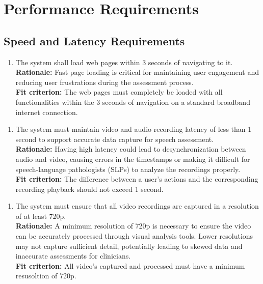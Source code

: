 \documentclass[12pt]{article}
\begin{document}
\section{Performance Requirements}
\subsection{Speed and Latency Requirements}
\begin{enumerate}[{PR-SL}1. ]
  \item The system shall load web pages within 3 seconds of navigating to it.\\
  \textbf{Rationale: }Fast page loading is critical for maintaining user engagement and reducing user frustrations during the assessment process.\\
  \textbf{Fit criterion: }The web pages must completely be loaded with all functionalities within the 3 seconds of navigation on a standard broadband internet connection.  
\end{enumerate}
\begin{enumerate}[{PR-SL}2. ]
  \item The system must maintain video and audio recording latency of less than 1 second to support accurate data capture for speech assessment.\\
  \textbf{Rationale: }Having high latency could lead to desynchronization between audio and video, causing errors in the timestamps or making it difficult for speech-language pathologists (SLPs) to analyze the recordings properly.\\
  \textbf{Fit criterion: }The difference between a user's actions and the corresponding recording playback should not exceed 1 second.  
\end{enumerate}
\begin{enumerate}[{PR-SL}3. ]
  \item The system must ensure that all video recordings are captured in a resolution of at least 720p.\\
  \textbf{Rationale: }A minimum resolution of 720p is necessary to ensure the video can be accurately processed through visual analysis tools. Lower resolutions may not capture sufficient detail, potentially leading to skewed data and inaccurate assessments for clinicians.\\
  \textbf{Fit criterion: }All video's captured and processed must have a minimum resusoltion of 720p.
\end{enumerate}
\end{document}
